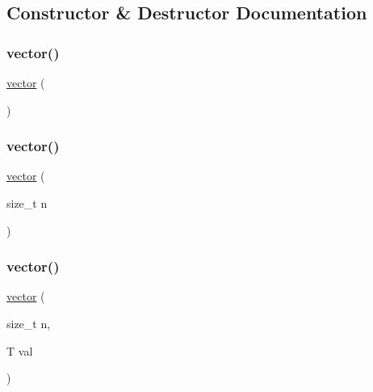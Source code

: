 \subsection{Constructor \& Destructor Documentation}
\mbox{\label{classvector_ad81d0c53b73688726d9e7da6fafe0383}} 
\subsubsection{\texorpdfstring{vector()}{vector()}\hspace{0.1cm}{\footnotesize\ttfamily [1/4]}}
{\footnotesize\ttfamily \mbox{\hyperlink{classvector}{vector}} (\begin{DoxyParamCaption}{ }\end{DoxyParamCaption})}

\mbox{\label{classvector_a377696eeda0d3794f02d1ba5c340c3b6}} 
\subsubsection{\texorpdfstring{vector()}{vector()}\hspace{0.1cm}{\footnotesize\ttfamily [2/4]}}
{\footnotesize\ttfamily \mbox{\hyperlink{classvector}{vector}} (\begin{DoxyParamCaption}\item[{size\+\_\+t}]{n }\end{DoxyParamCaption})\hspace{0.3cm}{\ttfamily [explicit]}}

\mbox{\label{classvector_aba6394eef90c3c8c7ab07919f476bb48}} 
\subsubsection{\texorpdfstring{vector()}{vector()}\hspace{0.1cm}{\footnotesize\ttfamily [3/4]}}
{\footnotesize\ttfamily \mbox{\hyperlink{classvector}{vector}} (\begin{DoxyParamCaption}\item[{size\+\_\+t}]{n,  }\item[{T}]{val }\end{DoxyParamCaption})}

